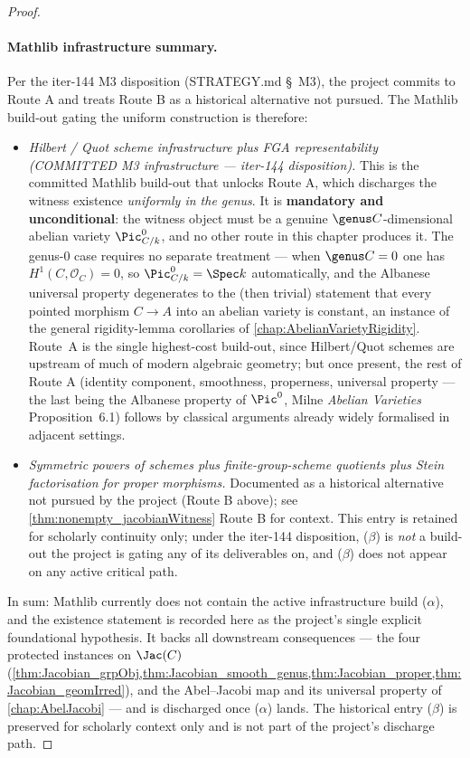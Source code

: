 \begin{proof}
  \paragraph{Mathlib infrastructure summary.}
  Per the iter-144 M3 disposition (STRATEGY.md \S~M3), the project commits to Route A and treats Route B as a historical alternative not pursued. The Mathlib build-out gating the uniform construction is therefore:
  \begin{itemize}
    \item[\textbf{(\(\alpha\))}] \emph{Hilbert / Quot scheme infrastructure plus FGA representability (COMMITTED M3 infrastructure --- iter-144 disposition).} This is the committed Mathlib build-out that unlocks Route A, which discharges the witness existence \emph{uniformly in the genus}. It is \textbf{mandatory and unconditional}: the witness object must be a genuine \(\genus C\)-dimensional abelian variety \(\Pic^0_{C/k}\), and no other route in this chapter produces it. The genus-\(0\) case requires no separate treatment --- when \(\genus C = 0\) one has \(H^1(C, \mathcal O_C) = 0\), so \(\Pic^0_{C/k} = \Spec k\) automatically, and the Albanese universal property degenerates to the (then trivial) statement that every pointed morphism \(C \to A\) into an abelian variety is constant, an instance of the general rigidity-lemma corollaries of \cref{chap:AbelianVarietyRigidity}. Route~A is the single highest-cost build-out, since Hilbert/Quot schemes are upstream of much of modern algebraic geometry; but once present, the rest of Route A (identity component, smoothness, properness, universal property --- the last being the Albanese property of \(\Pic^0\), Milne \emph{Abelian Varieties} Proposition~6.1) follows by classical arguments already widely formalised in adjacent settings.
    \item[\textbf{(\(\beta\), historical only --- not pursued).}] \emph{Symmetric powers of schemes plus finite-group-scheme quotients plus Stein factorisation for proper morphisms.} Documented as a historical alternative not pursued by the project (Route B above); see \cref{thm:nonempty_jacobianWitness} Route B for context. This entry is retained for scholarly continuity only; under the iter-144 disposition, (\(\beta\)) is \emph{not} a build-out the project is gating any of its deliverables on, and (\(\beta\)) does not appear on any active critical path.
  \end{itemize}
  In sum: Mathlib currently does not contain the active infrastructure build (\(\alpha\)), and the existence statement is recorded here as the project's single explicit foundational hypothesis. It backs all downstream consequences --- the four protected instances on \(\Jac(C)\) (\cref{thm:Jacobian_grpObj,thm:Jacobian_smooth_genus,thm:Jacobian_proper,thm:Jacobian_geomIrred}), and the Abel--Jacobi map and its universal property of \cref{chap:AbelJacobi} --- and is discharged once (\(\alpha\)) lands. The historical entry (\(\beta\)) is preserved for scholarly context only and is not part of the project's discharge path.

\end{proof}
